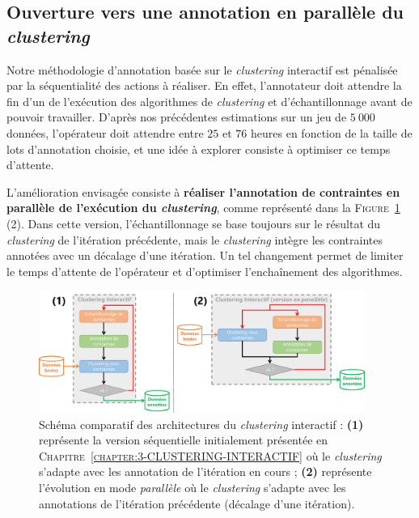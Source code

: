 		\subsection{Ouverture vers une annotation en parallèle du \textit{clustering}}
		
			Notre méthodologie d'annotation basée sur le \textit{clustering} interactif est pénalisée par la séquentialité des actions à réaliser.
			En effet, l'annotateur doit attendre la fin d'un de l'exécution des algorithmes de \textit{clustering} et d'échantillonnage avant de pouvoir travailler.
			D'après nos précédentes estimations sur un jeu de $5~000$ données, l'opérateur doit attendre entre $25$ et $76$ heures en fonction de la taille de lots d'annotation choisie, et une idée à explorer consiste à optimiser ce temps d'attente.
			
			L'amélioration envisagée consiste à \textbf{réaliser l'annotation de contraintes en parallèle de l'exécution du \textit{clustering}}, comme représenté dans la \textsc{Figure~\ref{figure:4.3.4-ETUDE-COUT-TOTAL-ARCHITECTURE}} (2).
			Dans cette version, l'échantillonnage se base toujours sur le résultat du \textit{clustering} de l'itération précédente, mais le \textit{clustering} intègre les contraintes annotées avec un décalage d'une itération.
			Un tel changement permet de limiter le temps d'attente de l'opérateur et d'optimiser l'enchaînement des algorithmes.

			\begin{figure}[!htb]
				\centering
				\includegraphics[width=0.95\textwidth]{figures/interactive-clustering-architecture-sequentielle-vs-parallele}
				\caption{
					Schéma comparatif des architectures du \textit{clustering} interactif : \textbf{(1)} représente la version séquentielle initialement présentée en \textsc{Chapitre~\ref{chapter:3-CLUSTERING-INTERACTIF}} où le \textit{clustering} s'adapte avec les annotation de l'itération en cours ; \textbf{(2)} représente l'évolution en mode \textit{parallèle} où le \textit{clustering} s'adapte avec les annotations de l'itération précédente (décalage d'une itération).
				}
				\label{figure:4.3.4-ETUDE-COUT-TOTAL-ARCHITECTURE}
			\end{figure}
			
